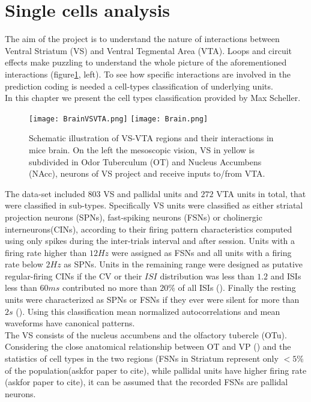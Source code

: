 
\section{Single cells analysis}
\label{chap:UnitsAnalysis}
The aim of the project is to understand the nature of interactions between Ventral Striatum (VS) and Ventral Tegmental Area (VTA). Loops and circuit effects make puzzling to understand the whole picture of the aforementioned interactions (figure\ref{fig:Brain}, left). To see how specific interactions are involved in the prediction coding is needed a cell-types classification of underlying units.\\
In this chapter we present the cell types classification provided by Max Scheller.
\begin{figure}
    \centering
    \texttt{[image: BrainVSVTA.png]}
    \texttt{[image: Brain.png]}
    \caption{Schematic illustration of VS-VTA regions and their interactions in mice brain. On the left the mesoscopic vision, VS in yellow is subdivided in Odor Tuberculum (OT) and Nucleus Accumbens (NAcc), neurons of VS project and receive inputs to/from VTA.}
    \label{fig:Brain}
\end{figure}
The data-set included $803$ VS and pallidal units and $272$ VTA units in total, that were classified in sub-types. Specifically VS units were classified as either striatal projection neurons (SPNs), fast-spiking neurons (FSNs) or cholinergic interneurons(CINs), according to their firing pattern characteristics computed using only spikes during the inter-trials interval and after session. Units with a firing rate higher than $12 Hz$ were assigned as FSNs and all units with a firing rate below $2 Hz$ as SPNs. Units in the remaining range were designed as putative regular-firing CINs if the CV or their $ISI$ distribution was less than $1.2$ and ISIs less than $60 ms$ contributed no more than $20\%$ of all ISIs (\cite{Inokawa}). Finally the resting units were characterized as SPNs or FSNs if they ever were silent for more than $2 s$ (\cite{Graybiel}). Using this classification mean normalized autocorrelations and mean waveforms have canonical patterns.\\ The VS consists of the nucleus accumbens and the olfactory tubercle (OTu).
Considering the close anatomical relationship between OT and VP (\cite{Heimer1982}) and the statistics of cell types in the two regions (FSNs in Striatum represent only $<5\%$ of the population({\color{red}askfor paper to cite}), while pallidal units have higher firing rate ({\color{red}askfor paper to cite}), it can be assumed that the recorded FSNs are pallidal neurons.\\
